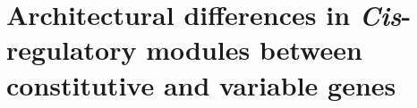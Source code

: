 \documentclass[../main.tex]{subfiles}
\begin{document}
	
\chapter{Architectural differences in \textit{Cis}\hyp{}regulatory modules between constitutive and variable genes}
\label{chapter1}



\end{document}

